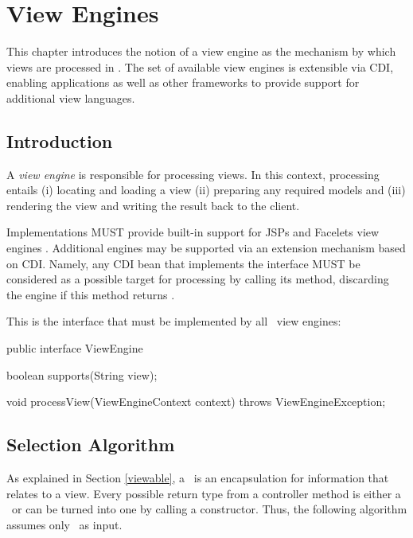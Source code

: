 \chapter{View Engines}
\label{view_engines}

This chapter introduces the notion of a view engine as the mechanism by which views
are processed in \mvc. The set of available view engines is extensible via CDI,
enabling applications as well as other frameworks to provide support for additional
view languages.

\section{Introduction}
\label{view_engines_introduction}

A {\em view engine} is responsible for processing views. In this context, processing entails
(i) locating and loading a view (ii) preparing any required models and (iii) rendering the 
view and writing the result back to the client. 

Implementations MUST provide built-in support for JSPs and Facelets view engines
. Additional
engines may be supported via an extension mechanism based on CDI. Namely, any CDI bean
that implements the  interface MUST be considered as
a possible target for processing by calling its  method, discarding the
engine if this method returns  .

This is the interface that must be implemented by all \mvc\ view engines:

\begin{listing}{1}
public interface ViewEngine {

    boolean supports(String view);

    void processView(ViewEngineContext context) throws ViewEngineException;
}
\end{listing}

\section{Selection Algorithm}
\label{selection_algorithm}

As explained in Section \ref{viewable}, a \Viewable\ is an encapsulation for information
that relates to a view. Every possible return type from a controller method is either
a \Viewable\ or can be turned into one by calling a constructor. Thus,
the following algorithm assumes only \Viewable\ as input.

